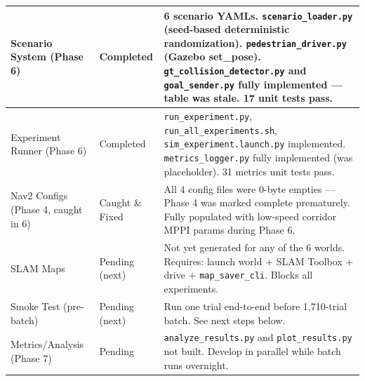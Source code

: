 \documentclass[11pt]{article}
\begin{document}
\begin{center}
\begin{tabular}{|l|l|p{7.5cm}|}
\hline
Scenario System (Phase 6) & \textcolor{fixgreen}{Completed} & 6 scenario YAMLs. \texttt{scenario\_loader.py} (seed-based deterministic randomization). \texttt{pedestrian\_driver.py} (Gazebo set\_pose). \texttt{gt\_collision\_detector.py} and \texttt{goal\_sender.py} fully implemented --- table was stale. 17 unit tests pass. \\
\hline
Experiment Runner (Phase 6) & \textcolor{fixgreen}{Completed} & \texttt{run\_experiment.py}, \texttt{run\_all\_experiments.sh}, \texttt{sim\_experiment.launch.py} implemented. \texttt{metrics\_logger.py} fully implemented (was placeholder). 31 metrics unit tests pass. \\
\hline
Nav2 Configs (Phase 4, caught in 6) & \textcolor{fixgreen}{Caught \& Fixed} & All 4 config files were 0-byte empties --- Phase 4 was marked complete prematurely. Fully populated with low-speed corridor MPPI params during Phase 6. \\
\hline
SLAM Maps & \textcolor{issuered}{Pending (next)} & Not yet generated for any of the 6 worlds. Requires: launch world + SLAM Toolbox + drive + \texttt{map\_saver\_cli}. Blocks all experiments. \\
\hline
Smoke Test (pre-batch) & \textcolor{issuered}{Pending (next)} & Run one trial end-to-end before 1,710-trial batch. See next steps below. \\
\hline
Metrics/Analysis (Phase 7) & \textcolor{issuered}{Pending} & \texttt{analyze\_results.py} and \texttt{plot\_results.py} not built. Develop in parallel while batch runs overnight. \\
\hline
\end{tabular}
\end{center}
\end{document}
